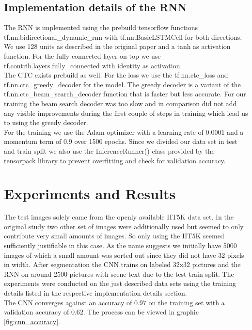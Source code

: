 \documentclass{utue} %
\begin{document}
\subsection{Implementation details of the RNN}
The RNN is implemented using the prebuild tensorflow functions tf.nn.bidirectional\_dynamic\_rnn with tf.nn.BasicLSTMCell for both directions. We use 128 units as described in the original paper and a tanh as activation function. For the fully connected layer on top we use tf.contrib.layers.fully\_connected with identity as activation. \\
The CTC exists prebuild as well. For the loss we use the tf.nn.ctc\_loss and tf.nn.ctc\_greedy\_decoder for the model. The greedy decoder is a variant of the tf.nn.ctc\_beam\_search\_decoder function that is faster but less accurate. For our training the beam search decoder was too slow and in comparison did not add any visible improvements during the first couple of steps in training which lead us to using the greedy decoder.  \\
For the training we use the Adam optimizer with a learning rate of 0.0001 and a momentum term of 0.9 over 1500 epochs. Since we divided our data set in test and train split we also use the InferenceRunner() class provided by the tensorpack library to prevent overfitting and check for validation accuracy. 

\section{Experiments and Results}
The test images solely came from the openly available IIT5K data set. In the original study two other set of images were additionally used but seemed to only contribute very small amounts of images. So only using the IIT5K seemed sufficiently justifiable in this case. As the name suggests we initially have 5000 images of which a small amount was sorted out since they did not have 32 pixels in width. After segmentation the CNN trains on %
labeled 32x32 pictures and the RNN on around 2500 pictures with scene text due to the test train split. 
The experiments were conducted on the just described data sets using the training details listed in the respective implementation details section. \\
The CNN converges against an accuracy of 0.97 on the training set with a validation accuracy of 0.62. The process can be viewed in graphic  \ref{fig:cnn_accuracy}.\\
\end{document}
